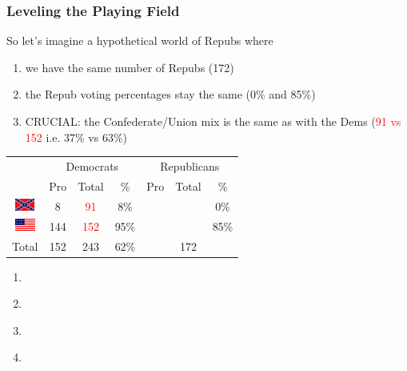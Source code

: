 \documentclass[slides]{beamer}\usepackage[]{graphicx}\usepackage[]{color}
\newcommand{\blue}[1]{\textcolor{blue2}{#1}}
\begin{document}
\begin{frame}
\frametitle{Leveling the Playing Field}
\begin{small}
So let's imagine a hypothetical world of Repubs where \pause
\begin{enumerate}
\item we have the same number of Repubs (172) \pause
\item the Repub voting percentages stay the same (0\% and 85\%) \pause
\item CRUCIAL: the Confederate/Union mix is the same as with the Dems (\textcolor{red}{91 vs 152} i.e. 37\% vs 63\%) \pause
\end{enumerate}
\end{small}


\begin{center}
	\begin{tabular}{c|ccc|ccc}
     & \multicolumn{3}{c|}{Democrats}  & \multicolumn{3}{c}{Republicans} \\ 
     & Pro & Total & \% & Pro & Total & \% \\ 
     \hline
     \includegraphics[height=0.4cm]{conf} & 8 & \textcolor{red}{91} & 8\% &  &  & 0\% \\ 
	 \includegraphics[height=0.4cm]{union} & 144 & \textcolor{red}{152} & 95\% &  &  & 85\% \\ 
    \hline
     Total & 152 & 243 & 62\% & & 172 & \blue{} \\ 
  \end{tabular}
\end{center}

\begin{enumerate}
\item[] \textcolor{white}{91/(91 + 152) = 37\% $\times$ 172 = 64}
\item[] \textcolor{white}{172 - 64 = 108}
\item[] \textcolor{white}{64 $\times$ 0\% = 0 and 108 $\times$ 85\% = 92}
\item[] \textcolor{white}{92/(92+172) = 53\%}
\end{enumerate}

\end{frame}
\end{document}
